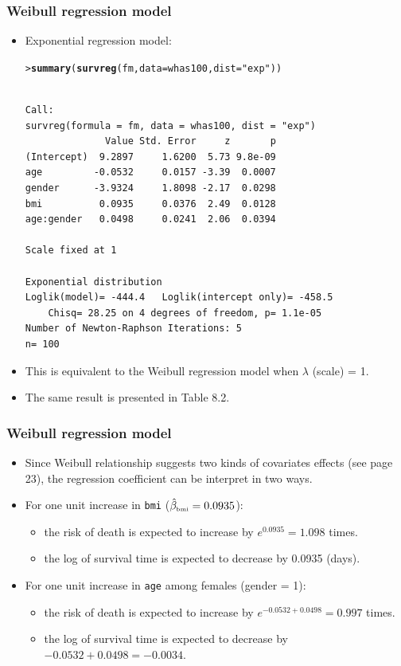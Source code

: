 \documentclass[10pt]{beamer}\usepackage[]{graphicx}\usepackage[]{color}
\makeatletter
\newcommand{\hlstr}[1]{\textcolor[rgb]{0.192,0.494,0.8}{#1}}%
\newcommand{\hlstd}[1]{\textcolor[rgb]{0.345,0.345,0.345}{#1}}%
\newcommand{\hlkwc}[1]{\textcolor[rgb]{0.333,0.667,0.333}{#1}}%
\newcommand{\hlkwd}[1]{\textcolor[rgb]{0.737,0.353,0.396}{\textbf{#1}}}%
\newenvironment{kframe}{%
 \def\at@end@of@kframe{}%
 \ifinner\ifhmode%
  \def\at@end@of@kframe{\end{minipage}}%
  \begin{minipage}{\columnwidth}%
 \fi\fi%
 \def\FrameCommand##1{\hskip\@totalleftmargin \hskip-\fboxsep
 \colorbox{shadecolor}{##1}\hskip-\fboxsep
     \hskip-\linewidth \hskip-\@totalleftmargin \hskip\columnwidth}%
 \MakeFramed {\advance\hsize-\width
   \@totalleftmargin\z@ \linewidth\hsize
   \@setminipage}}%
 {\par\unskip\endMakeFramed%
 \at@end@of@kframe}
\newenvironment{knitrout}{}{} %
\renewenvironment{knitrout}{\setlength{\topsep}{-.2mm}}{}
\newcommand{\code}[1]{{\texttt{#1}}}
\makeatother
\begin{document}
\begin{frame}[fragile]
  \frametitle{Weibull regression model}
  \begin{itemize}
  \item Exponential regression model:
\begin{knitrout}\scriptsize
{}\color{fgcolor}\begin{kframe}
\begin{alltt}
\hlstd{> }\hlkwd{summary}\hlstd{(}\hlkwd{survreg}\hlstd{(fm,} \hlkwc{data} \hlstd{= whas100,} \hlkwc{dist} \hlstd{=} \hlstr{"exp"}\hlstd{))}
\end{alltt}
\begin{verbatim}

Call:
survreg(formula = fm, data = whas100, dist = "exp")
              Value Std. Error     z       p
(Intercept)  9.2897     1.6200  5.73 9.8e-09
age         -0.0532     0.0157 -3.39  0.0007
gender      -3.9324     1.8098 -2.17  0.0298
bmi          0.0935     0.0376  2.49  0.0128
age:gender   0.0498     0.0241  2.06  0.0394

Scale fixed at 1 

Exponential distribution
Loglik(model)= -444.4   Loglik(intercept only)= -458.5
	Chisq= 28.25 on 4 degrees of freedom, p= 1.1e-05 
Number of Newton-Raphson Iterations: 5 
n= 100 
\end{verbatim}
\end{kframe}
\end{knitrout}
\item This is equivalent to the Weibull regression model when $\lambda$ (scale) = 1.
\item The same result is presented in Table 8.2.
\end{itemize}
\end{frame}

\begin{frame}
  \frametitle{Weibull regression model}
  \begin{itemize}
  \item Since Weibull relationship suggests two kinds of covariates effects (see page 23),
    the regression coefficient can be interpret in two ways.
  \item For one unit increase in \code{bmi} ($\hat\beta_{\tiny\mbox{bmi}} = 0.0935$):
    \begin{itemize}
    \item the risk of death is expected to increase by $e^{0.0935} = 1.098$ times.
    \item the log of survival time is expected to decrease by 0.0935 (days).
    \end{itemize}
  \item For one unit increase in \code{age} among females (gender = 1):
    \begin{itemize}
    \item the risk of death is expected to increase by $e^{-0.0532+0.0498} = 0.997$ times.
    \item the log of survival time is expected to decrease by $-0.0532+0.0498 = -0.0034$.
    \end{itemize}    
  \end{itemize}
\end{frame}
\end{document}
